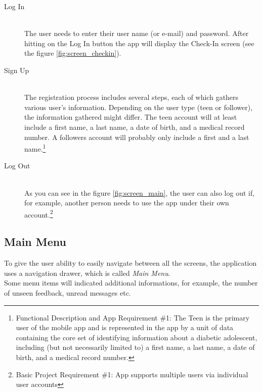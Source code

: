 \documentclass{article}
\begin{document}
    \begin{description}
        \item[Log In] \hfill \\
        The user needs to enter their user name (or e-mail) and password. After hitting on the Log In button the app will display the Check-In screen (see the figure \ref{fig:screen_checkin}).
        \item[Sign Up] \hfill \\
            The registration process includes several steps, each of which gathers various user's information. Depending on the user type (teen or follower), the information gathered might differ. The teen account will at least include a first name, a last name, a date of birth, and a medical record number. A followers account will probably only include a first and a last name.\footnote{Functional Description and App Requirement \#1: The Teen is the primary user of the mobile app and is represented in the app by a unit of data containing the core set of identifying information about a diabetic adolescent, including (but not necessarily limited to) a first name, a last name, a date of birth, and a medical record number.}
        \item[Log Out] \hfill \\
        As you can see in the figure \ref{fig:screen_main}, the user can also log out if, for example, another person needs to use the app under their own account.\footnote{Basic Project Requirement \#1: App supports multiple users via individual user accounts}
    \end{description}

\newpage

    \subsection{Main Menu}

    To give the user ability to easily navigate between all the screens, the application uses a navigation drawer, which is called \emph{Main Menu}.\\Some menu items will indicated additional informations, for example, the number of unseen feedback, unread messages etc.
\end{document}
